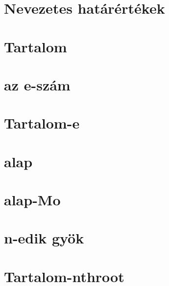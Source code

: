 






\begin{spacing}{1.2}


   \section*{Nevezetes határértékek}

   \section*{Tartalom} \label{Tart}
         \newline
         \newline
      \newpage
      \section*{az e-szám} \label{e}
      \section*{Tartalom-e} \label{Tarte}
         \newline
         \newpage
         \section*{alap} \label{e1}
         \Fa{
            
         }
         \newpage
         \section*{alap-Mo} \label{e1Mo}
         \Mo{
            
         }
         \newpage
      \section*{n-edik gyök} \label{nthroot}
      \section*{Tartalom-nthroot} \label{Tartnthroot}
         \newline
         \newline
         \newline
         \newline
         \newpage

\end{spacing}
